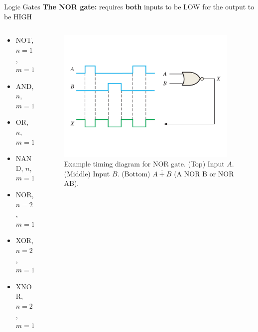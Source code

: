 \documentclass{beamer}
\begin{document}
\begin{frame}{Logic Gates}
\textbf{The NOR gate:} requires \textbf{both} inputs to be LOW for the output to be HIGH \\ \vspace{0.5cm}
\begin{columns}[T]
\begin{column}{0.5\textwidth}
\begin{itemize}
\item \alert{NOT, $n=1$, $m=1$}
\item \alert{AND, $n$, $m=1$}
\item \alert{OR, $n$, $m=1$}
\item \alert{NAND, $n$, $m=1$}
\item \alert{NOR, $n=2$, $m=1$}
\item XOR, $n=2$, $m=1$
\item XNOR, $n=2$, $m=1$
\end{itemize}
\end{column}
\begin{column}{0.5\textwidth}
\begin{figure}
\centering
\includegraphics[width=0.95\textwidth,trim=0cm 4cm 0cm 4cm,clip=true]{figures/TimingNor.pdf}
\caption{\label{fig:nor2} Example timing diagram for NOR gate.  (Top) Input $A$.  (Middle) Input $B$. (Bottom) $\overline{A+B}$ (A NOR B or NOR AB).}
\end{figure}
\end{column}
\end{columns}
\end{frame}
\end{document}
